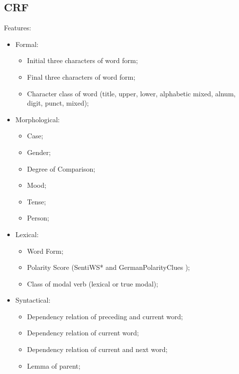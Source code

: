 \documentclass{beamer}
\begin{document}
    \subsection{CRF}
    \begin{frame}{\insertsubsection}
      Features:
      \begin{multicols}{2}
        \begin{itemize}
        \item Formal:
          \begin{itemize}
            \tiny
          \item Initial three characters of word form;
          \item Final three characters of word form;
          \item Character class of word (title, upper, lower,
            alphabetic mixed, alnum, digit, punct, mixed);
          \end{itemize}
        \item Morphological:
          \begin{itemize}
            \tiny
          \item Case;
          \item Gender;
          \item Degree of Comparison;
          \item Mood;
          \item Tense;
          \item Person;
          \end{itemize}
        \item Lexical:
          \begin{itemize}
            \tiny
          \item Word Form;
          \item Polarity Score (SentiWS* \cite{Remus-10} and
            GermanPolarityClues \cite{Waltinger-10});
          \item Class of modal verb (lexical or true modal);
          \end{itemize}
        \item Syntactical:
          \begin{itemize}
            \tiny
            \item Dependency relation of preceding and current word;
            \item Dependency relation of current word;
            \item Dependency relation of current and next word;
            \item Lemma of parent;

\end{itemize}
\end{itemize}
\end{multicols}
\end{frame}
\end{document}

